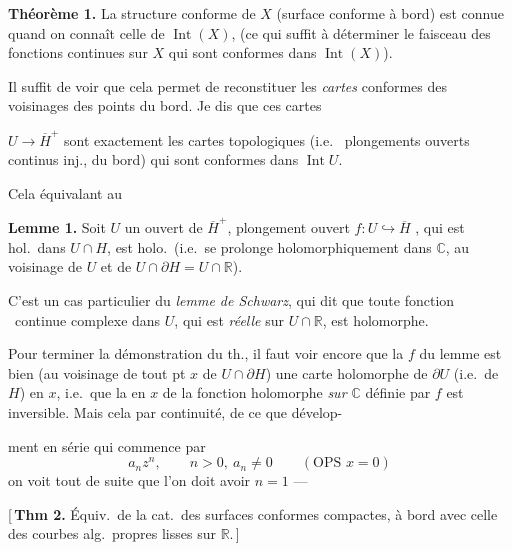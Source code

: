 \documentclass[11pt,a4paper]{article}
\begin{document}
\textbf{Théorème 1.} La structure conforme de $X$ (surface conforme à bord) est connue quand on connaît celle de $\operatorname{Int}(X)$, (ce qui suffit à déterminer le faisceau des fonctions  continues sur $X$ qui sont conformes dans $\operatorname{Int}(X)$).

Il suffit de voir que cela permet de reconstituer les \emph{cartes} conformes des voisinages des points du bord. Je dis que ces cartes

$U \to \overline{H}^{+}$ sont exactement les cartes topologiques (i.e.\  plongements  ouverts continus inj., \ill{}  du bord) qui sont conformes dans $\operatorname{Int} U$.

Cela  équivalant au

\textbf{Lemme 1.} Soit $U$ un ouvert de $\overline{H}^{+}$,  plongement ouvert $f : U \hookrightarrow \overline{H}$ , qui est hol.\ dans $U \cap H$, est holo.\ (i.e.\ se prolonge holomorphiquement dans $\mathbb{C}$, au voisinage de $U$ et de $U \cap \partial H = U \cap \mathbb{R}$).

C'est un cas particulier du \emph{lemme de Schwarz}, qui dit que toute fonction \ continue complexe dans $U$, qui est \emph{réelle} sur $U \cap \mathbb{R}$, est holomorphe.

Pour terminer la démonstration du  th., il faut voir encore que la $f$ du lemme est bien (au voisinage de tout pt $x$ de $U \cap \partial H$) une carte holomorphe de $\partial U$ (i.e.\ de $H$) en $x$, i.e.\ que la  en $x$ de la fonction holomorphe \emph{sur $\mathbb{C}$} définie par $f$ est inversible. Mais cela \ill{} \ill{} par continuité,  de ce que  dévelop-

ment en série qui commence par
\[
  a_n z^{n}, \qquad n > 0,\ a_n \neq 0 \qquad (\text{OPS } x = 0)
\]
on voit tout de suite que l'on doit avoir $n = 1$ ---

[\,\textbf{Thm 2.} Équiv.\ de la cat.\ des surfaces conformes compactes, à bord avec celle des courbes alg.\ propres lisses sur $\mathbb{R}$.\,]
\end{document}
